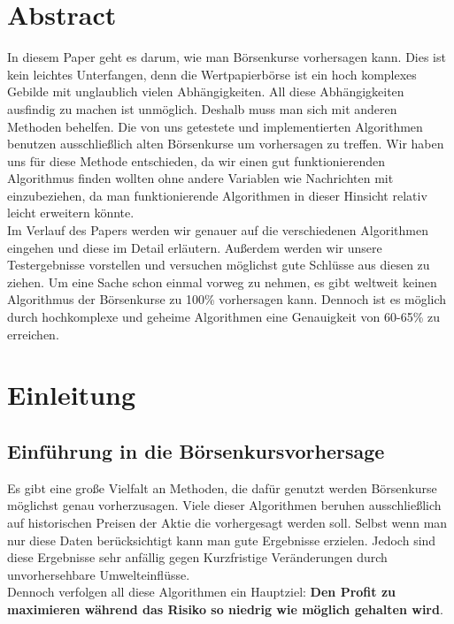 \documentclass[12pt]{article} %
\begin{document}
\tableofcontents %

\newpage %

\section{Abstract}

In diesem Paper geht es darum, wie man Börsenkurse vorhersagen kann. Dies ist kein leichtes Unterfangen, denn die Wertpapierbörse ist ein hoch komplexes Gebilde mit unglaublich vielen Abhängigkeiten. All diese Abhängigkeiten ausfindig zu machen ist unmöglich. Deshalb muss man sich mit anderen Methoden behelfen. Die von uns getestete und implementierten Algorithmen benutzen ausschließlich alten Börsenkurse um vorhersagen zu treffen. Wir haben uns für diese Methode entschieden, da wir einen gut funktionierenden Algorithmus finden wollten ohne andere Variablen wie Nachrichten mit einzubeziehen, da man funktionierende Algorithmen in dieser Hinsicht relativ leicht erweitern könnte.\\
Im Verlauf des Papers werden wir genauer auf die verschiedenen Algorithmen eingehen und diese im Detail erläutern. Außerdem werden wir unsere Testergebnisse vorstellen und versuchen möglichst gute Schlüsse aus diesen zu ziehen. Um eine Sache schon einmal vorweg zu nehmen, es gibt weltweit keinen Algorithmus der Börsenkurse zu 100\% vorhersagen kann. Dennoch ist es möglich durch hochkomplexe und geheime Algorithmen eine Genauigkeit von 60-65\% zu erreichen. 

\section{Einleitung}
\label{introduction}
\subsection{Einführung in die Börsenkursvorhersage}

Es gibt eine große Vielfalt an Methoden, die dafür genutzt werden Börsenkurse möglichst genau vorherzusagen. Viele dieser Algorithmen beruhen ausschließlich auf historischen Preisen der Aktie die vorhergesagt werden soll. Selbst wenn man nur diese Daten berücksichtigt kann man gute Ergebnisse erzielen. Jedoch sind diese Ergebnisse sehr anfällig gegen Kurzfristige Veränderungen durch unvorhersehbare Umwelteinflüsse.\\
Dennoch verfolgen all diese Algorithmen ein Hauptziel: \textbf{Den Profit zu maximieren während das Risiko so niedrig wie möglich gehalten wird}.
\end{document}
